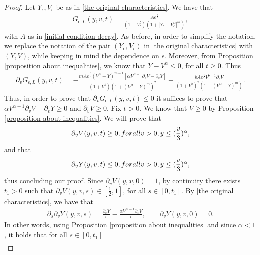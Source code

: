 \documentclass[10pt,a4paper]{amsart}
\begin{document}
 \begin{proof}
  Let $Y_{\epsilon}, V_{\epsilon}$ be as in \eqref{the original characteristics}.    We have that 
     \begin{align*}
         G_{\epsilon,L}(y,v,t)=\frac{A e^{\frac{t}{\epsilon}}}{(1+V_{\epsilon}^{b})(1+|Y_{\epsilon}-V_{\epsilon}^{\alpha}|^{m})},
     \end{align*}
with $A$ as in \eqref{initial condition decay}. As before, in order to simplify the notation, we replace the notation of the pair $(Y_{\epsilon},V_{\epsilon})$ in \eqref{the original characteristics} with $(Y,V)$, while keeping in mind the dependence on $\epsilon$.    Moreover, from Proposition \ref{proposition about inequalities}, we know that $Y-V^{\alpha}\leq 0$, for all $t\geq 0$. Thus
     \begin{align*}
         \partial_{v}G_{\epsilon,L}(y,v,t)=-\frac{mA e^{\frac{t}{\epsilon}}(V^{\alpha}-Y)^{m-1}[\alpha V^{\alpha-1}\partial_{v}V-\partial_{v}Y]}{(1+V^{b})(1+(V^{\alpha}-Y)^{m})^{2}}-\frac{b Ae^{\frac{t}{\epsilon}}V^{b-1}\partial_{v}V}{(1+V^{b})^{2}(1+(V^{\alpha}-Y)^{m})}.
     \end{align*}
     Thus, in order to prove that $\partial_{v}G_{\epsilon,L}(y,v,t)\leq 0$ it suffices to prove that $\alpha V^{\alpha-1}\partial_{v}V-\partial_{v}Y\geq 0$ and $\partial_{v}V\geq 0$. Fix $t>0$. We know that $V\geq 0$ by Proposition \ref{proposition about inequalities}. We will prove that
     \begin{align*}
         \partial_{v}V(y,v,t)\geq 0, \textup{ for all } v>0, y\leq (\frac{v}{3})^{\alpha},
     \end{align*}
     and that
     \begin{align*}
         \partial_{v}Y(y,v,t)\leq 0, \textup{ for all } v>0, y\leq (\frac{v}{3})^{\alpha},
     \end{align*}
     thus concluding our proof. Since $\partial_{v}V(y,v,0)=1$, by continuity there exists $t_{1}>0$ such that $\partial_{v}V(y,v,s)\in[\frac{1}{2},1]$, for all $s\in[0,t_{1}]$. By \eqref{the original characteristics}, we have that
     \begin{align*}
         \partial_{s}\partial_{v}Y(y,v,s)=\frac{\partial_{v}Y}{\epsilon}-\frac{\alpha V^{\alpha-1}\partial_{v}V}{\epsilon}, \qquad \partial_{v}Y(y,v,0)=0.
     \end{align*}
     In other words, using Proposition \ref{proposition about inequalities} and since $\alpha<1$, it holds that for all $s\in[0,t_{1}]$ 
     \begin{align*}

\end{align*}
\end{proof}
\end{document}

